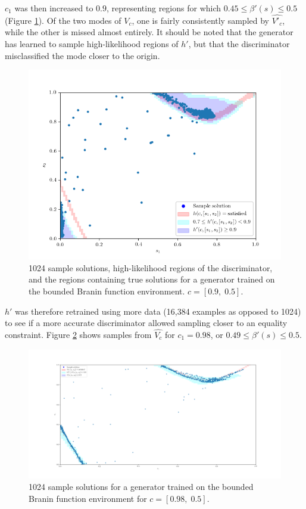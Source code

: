 \documentclass[../../main.tex]{subfiles}
\begin{document}
$c_1$ was then increased to $0.9$, representing regions for which $0.45\le\beta'(s)\le0.5$ (Figure \ref{fig:equality09}).
Of the two modes of $V_c$, one is fairly consistently sampled by $\hat{V'_c}$, while the other is missed almost entirely.
It should be noted that the generator has learned to sample high-likelihood regions of $h'$, but that the discriminator misclassified the mode closer to the origin.
\begin{figure}[H]
    \begin{center}
    \includegraphics[width=\textwidth]{equality09}
    \caption[Samples matching an inaccurate discriminator]{
        1024 sample solutions, high-likelihood regions of the discriminator, and the regions containing true solutions for a generator trained on the bounded Branin function environment.
        $c=[0.9,\;0.5]$.
    }
    \label{fig:equality09}
    \end{center}
\end{figure}
$h'$ was therefore retrained using more data (16,384 examples as opposed to 1024) to see if a more accurate discriminator allowed sampling closer to an equality constraint.
Figure \ref{fig:equality09805} shows samples from $\hat{V_c}$ for $c_1=0.98$, or $0.49\le\beta'(s)\le0.5$.
\begin{figure}
    \centering
    \includegraphics[width=\textwidth]{equality09805}
    \caption[Samples from a psuedo-equality constraint]{
        1024 sample solutions for a generator trained on the bounded Branin function environment for $c=[0.98,\;0.5]$.
    }
    \label{fig:equality09805}
\end{figure}
\end{document}

